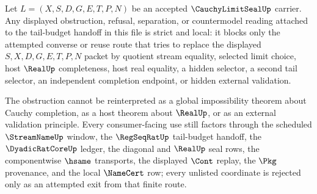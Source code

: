 \begin{corollary}
\label{cor:cauchy-limit-seal-tail-budget-handoff-strict-local-obstruction}
Let $L=(X,S,D,G,E,T,P,N)$ be an accepted $\CauchyLimitSealUp$ carrier. Any displayed obstruction, refusal, separation, or countermodel reading attached to the tail-budget handoff in this file is strict and local: it blocks only the attempted converse or reuse route that tries to replace the displayed $S,X,D,G,E,T,P,N$ packet by quotient stream equality, selected limit choice, host $\RealUp$ completeness, host real equality, a hidden selector, a second tail selector, an independent completion endpoint, or hidden external validation.

The obstruction cannot be reinterpreted as a global impossibility theorem about Cauchy completion, as a host theorem about $\RealUp$, or as an external validation principle. Every consumer-facing use still factors through the scheduled $\StreamNameUp$ window, the $\RegSeqRatUp$ tail-budget handoff, the $\DyadicRatCoreUp$ ledger, the diagonal and $\RealUp$ seal rows, the componentwise $\hsame$ transports, the displayed $\Cont$ replay, the $\Pkg$ provenance, and the local $\NameCert$ row; every unlisted coordinate is rejected only as an attempted exit from that finite route.
\end{corollary}

